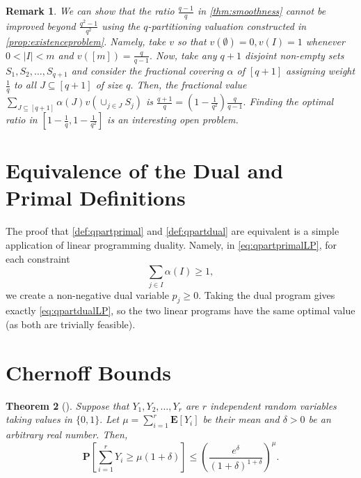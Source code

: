 \documentclass[11pt]{article}%
\newtheorem{theorem}{Theorem}
\newtheorem{remark}[theorem]{Remark}
\numberwithin{theorem}{subsection}
\newcommand{\prob}{\mathbf{P}}
\newcommand{\expect}{\mathbf{E}}
\begin{document}
\begin{remark}
\label{remark:closenessgap}
\normalfont
We can show that the ratio $\frac{q-1}{q}$ in \cref{thm:smoothness} cannot be improved beyond $ \frac{q^2 - 1}{q^2}$ using
the $q$-partitioning valuation constructed in \cref{prop:existenceproblem}. Namely, take $v$ so that $v(\emptyset) =0,
v(I) = 1$ whenever $0 <|I|<m$ and $v([m]) =\frac{q}{q-1}.$ Now, take any $q+1$ disjoint non-empty sets $S_1, S_2, \ldots, S_{q+1}$ and consider the fractional covering $\alpha$ of $[q+1]$
assigning weight $\frac{1}{q}$ to all $J\subseteq [q+1]$ of  size $q.$ Then, the fractional value 
$\displaystyle \sum_{J \subseteq [q+1]}\alpha(J)v(\cup_{j \in J}S_j)$
is $\frac{q+1}{q} = (1 - \frac{1}{q^2})\frac{q}{q-1}.$ Finding the optimal ratio in $[1 - \frac{1}{q}, 1 - \frac{1}{q^2}]$ is an interesting open problem.
\end{remark}


\section{Equivalence of the Dual and Primal Definitions}
\label{section:definitionequivalence}
The proof that \cref{def:qpartprimal} and \cref{def:qpartdual} are equivalent is a simple application of 
linear programming duality. Namely, in \cref{eq:qpartprimalLP}, for each constraint 
$$
\sum_{j \in I}
\alpha(I)\ge 1, 
$$
we create a non-negative dual variable $p_j \ge 0.$ Taking the dual program gives exactly 
\cref{eq:qpartdualLP}, so the two linear programs have the same optimal value (as both are trivially feasible).


\section{Chernoff Bounds}
\begin{theorem}[{\cite[Theorem 4.4]{Mitzenmacher05}}]
\label{thm:chernoff}
Suppose that $Y_1, Y_2, \ldots, Y_r$ are $r$ independent random variables taking values in $\{0,1\}.$ Let $\mu = \sum_{i=1}^r \expect[Y_i]$ be their mean and $\delta>0$ be an arbitrary real number. Then,
$$
\prob\left[\sum_{i = 1}^r Y_i \ge \mu(1 + \delta)\right]
\le 
\left(
\frac{e^\delta}{(1+\delta)^{1+\delta}}
\right)^{\mu}.
$$
\end{theorem}
\end{document}
